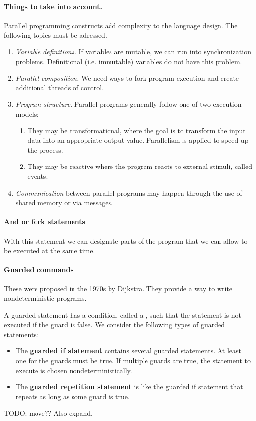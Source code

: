 \paragraph{Things to take into account.} Parallel programming constructs add complexity to the language design. The following topics must be adressed.
\begin{enumerate}
\item \textit{Variable definitions.} If variables are mutable, we can run into synchronization problems. Definitional (i.e. immutable) variables do not have this problem.
\item \textit{Parallel composition.} We need ways to fork program execution and create additional threads of control.
\item \textit{Program structure}. Parallel programs generally follow one of two execution models:
\begin{enumerate}
\item They may be transformational, where the goal is to transform the input data into an appropriate output value. Parallelism is applied to speed up the process.
\item They may be reactive where the program reacts to external stimuli, called events.
\end{enumerate}
\item \textit{Communication} between parallel programs may happen through the use of shared memory or via messages.
\end{enumerate}
\paragraph{And or fork statements}
With this statement we can designate parts of the program that we can allow to be executed at the same time.

\paragraph{Guarded commands} These were proposed in the 1970s by Dijkstra. They provide a way to write nondeterministic programs.

A guarded statement has a condition, called a , such that the statement is not executed if the guard is false. We consider the following types of guarded statements:
\begin{itemize}
\item The \textbf{guarded if statement} contains several guarded statements. At least one for the guards must be true. If multiple guards are true, the statement to execute is chosen nondeterministically.
\item The \textbf{guarded repetition statement} is like the guarded if statement that repeats as long as some guard is true.
\end{itemize}
TODO: move?? Also expand.

